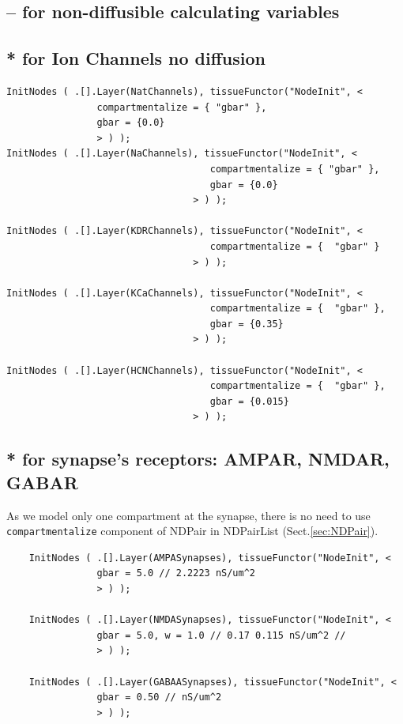 \subsection{-- for non-diffusible calculating variables}


\subsection{* for Ion Channels no diffusion}

{\tiny
\begin{verbatim}
InitNodes ( .[].Layer(NatChannels), tissueFunctor("NodeInit", <
				compartmentalize = { "gbar" },
				gbar = {0.0} 
				> ) ); 
InitNodes ( .[].Layer(NaChannels), tissueFunctor("NodeInit", <
									compartmentalize = { "gbar" },
									gbar = {0.0}
								 > ) );	

InitNodes ( .[].Layer(KDRChannels), tissueFunctor("NodeInit", <
									compartmentalize = {  "gbar" }
								 > ) );

InitNodes ( .[].Layer(KCaChannels), tissueFunctor("NodeInit", <
									compartmentalize = {  "gbar" },
									gbar = {0.35}
								 > ) );

InitNodes ( .[].Layer(HCNChannels), tissueFunctor("NodeInit", <
									compartmentalize = {  "gbar" },
									gbar = {0.015}
								 > ) );
\end{verbatim}
}

\subsection{* for synapse's receptors: AMPAR, NMDAR, GABAR}

As we model only one compartment at the synapse, there is no need to use 
\verb!compartmentalize! component of NDPair in NDPairList
(Sect.\ref{sec:NDPair}).

{\tiny 
\begin{verbatim}
	InitNodes ( .[].Layer(AMPASynapses), tissueFunctor("NodeInit", <
				gbar = 5.0 // 2.2223 nS/um^2
				> ) );

	InitNodes ( .[].Layer(NMDASynapses), tissueFunctor("NodeInit", <
				gbar = 5.0, w = 1.0 // 0.17 0.115 nS/um^2 // 
				> ) );

	InitNodes ( .[].Layer(GABAASynapses), tissueFunctor("NodeInit", <
				gbar = 0.50 // nS/um^2
				> ) );  
\end{verbatim}
}

